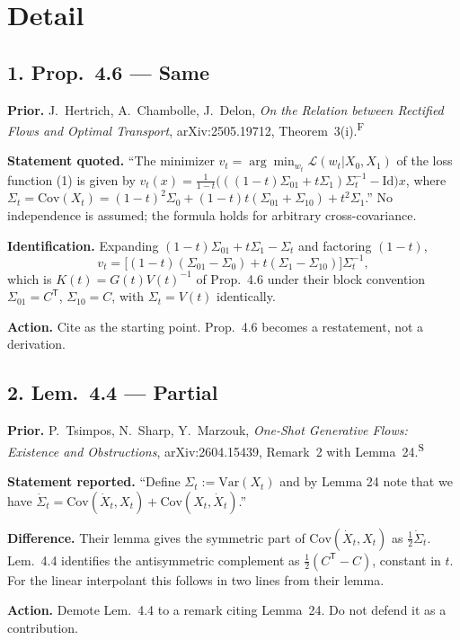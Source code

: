 \documentclass[11pt]{article}
\newcommand{\F}{\textsuperscript{F}}
\newcommand{\Sec}{\textsuperscript{S}}
\newcommand{\T}{\mathsf{T}}
\begin{document}
\section{Detail}

\subsection*{1. Prop.~4.6 --- Same}

\textbf{Prior.} J.~Hertrich, A.~Chambolle, J.~Delon, \emph{On the Relation between Rectified Flows
and Optimal Transport}, arXiv:2505.19712, Theorem~3(i).\F

\textbf{Statement quoted.} ``The minimizer $v_t=\arg\min_{w_t}\mathcal L(w_t|X_0,X_1)$ of the loss
function (1) is given by
$v_t(x)=\frac{1}{1-t}\big(((1-t)\Sigma_{01}+t\Sigma_1)\Sigma_t^{-1}-\mathrm{Id}\big)x$, where
$\Sigma_t=\mathrm{Cov}(X_t)=(1-t)^2\Sigma_0+(1-t)t(\Sigma_{01}+\Sigma_{10})+t^2\Sigma_1$.''
No independence is assumed; the formula holds for arbitrary cross-covariance.

\textbf{Identification.} Expanding $(1-t)\Sigma_{01}+t\Sigma_1-\Sigma_t$ and factoring $(1-t)$,
\[
v_t=\big[(1-t)(\Sigma_{01}-\Sigma_0)+t(\Sigma_1-\Sigma_{10})\big]\Sigma_t^{-1},
\]
which is $K(t)=G(t)V(t)^{-1}$ of Prop.~4.6 under their block convention
$\Sigma_{01}=C^{\T}$, $\Sigma_{10}=C$, with $\Sigma_t=V(t)$ identically.

\textbf{Action.} Cite as the starting point. Prop.~4.6 becomes a restatement, not a derivation.

\subsection*{2. Lem.~4.4 --- Partial}

\textbf{Prior.} P.~Tsimpos, N.~Sharp, Y.~Marzouk, \emph{One-Shot Generative Flows: Existence and
Obstructions}, arXiv:2604.15439, Remark~2 with Lemma~24.\Sec

\textbf{Statement reported.} ``Define $\Sigma_t:=\mathrm{Var}(X_t)$ and by Lemma 24 note that we
have $\dot\Sigma_t=\mathrm{Cov}(\dot X_t,X_t)+\mathrm{Cov}(X_t,\dot X_t)$.''

\textbf{Difference.} Their lemma gives the symmetric part of $\mathrm{Cov}(\dot X_t,X_t)$ as
$\tfrac12\dot\Sigma_t$. Lem.~4.4 identifies the antisymmetric complement as $\tfrac12(C^{\T}-C)$,
constant in $t$. For the linear interpolant this follows in two lines from their lemma.

\textbf{Action.} Demote Lem.~4.4 to a remark citing Lemma~24. Do not defend it as a contribution.
\end{document}
